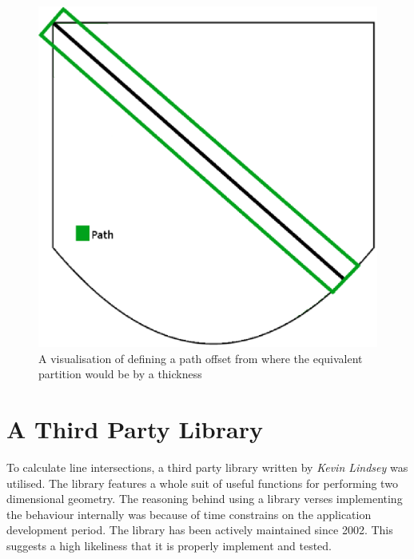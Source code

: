\begin{figure}[H]
  \centering
    \includegraphics[width=\textwidth]{graphics/images/thickness.eps}
  \caption{A visualisation of defining a path offset from where the equivalent partition would be by a thickness}
  \label{fig:thickness}
  
\end{figure}


\section{A Third Party Library}
To calculate line intersections, a third party library\cite{2dforyou} written by \emph{Kevin Lindsey} was utilised.  The library features a whole suit of useful functions for performing two dimensional geometry. The reasoning behind using a library verses  implementing the behaviour internally was because of time constrains on the application development period. The library has been actively maintained since 2002. This suggests a high likeliness that it is properly implement and tested.


























